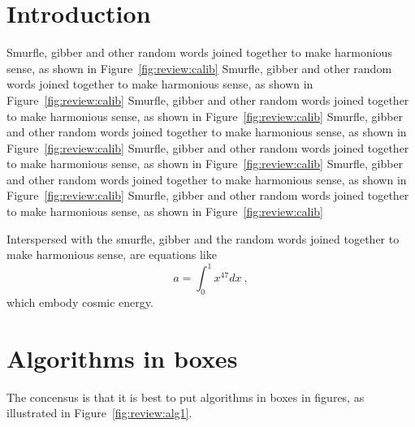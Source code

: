 
\section{Introduction}
\label{sec:review:introduction}

Smurfle, gibber and other random words joined together
to make harmonious sense, as shown in Figure~\ref{fig:review:calib}
Smurfle, gibber and other random words joined together
to make harmonious sense, as shown in Figure~\ref{fig:review:calib}
Smurfle, gibber and other random words joined together
to make harmonious sense, as shown in Figure~\ref{fig:review:calib}
Smurfle, gibber and other random words joined together
to make harmonious sense, as shown in Figure~\ref{fig:review:calib}
Smurfle, gibber and other random words joined together
to make harmonious sense, as shown in Figure~\ref{fig:review:calib}
Smurfle, gibber and other random words joined together
to make harmonious sense, as shown in Figure~\ref{fig:review:calib}
Smurfle, gibber and other random words joined together
to make harmonious sense, as shown in Figure~\ref{fig:review:calib}



Interspersed with
the smurfle, gibber and the random words joined together
to make harmonious sense, are equations like
\begin{equation}
\label{eq:review:rubbish}
a = \int_{0}^{1} x^{47} dx ~,
\end{equation}
which embody cosmic energy.




\section{Algorithms in boxes}

The concensus is that it is best to put algorithms in boxes in
figures, as illustrated in Figure~\ref{fig:review:alg1}.

